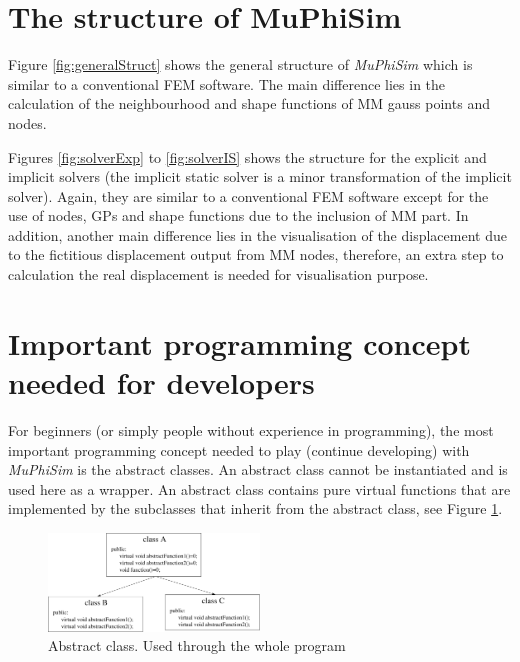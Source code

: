 \documentclass[oneside,11pt,times]{book}
\begin{document}
\section{The structure of MuPhiSim}
Figure \ref{fig:generalStruct} shows the general structure of \textit{MuPhiSim} which is similar to a conventional FEM software. The main difference lies in the calculation of the neighbourhood and shape functions of MM gauss points and nodes.


Figures \ref{fig:solverExp} to \ref{fig:solverIS} shows the structure for the explicit and implicit solvers (the implicit static solver is a minor transformation of the implicit solver). Again, they are similar to a conventional FEM software except for the use of nodes, GPs and shape functions due to the inclusion of MM part. In addition, another main difference lies in the visualisation of the displacement due to the fictitious displacement output from MM nodes, therefore, an extra step to calculation the real displacement is needed for visualisation purpose.

\section[Programming concept]{Important programming concept needed for developers}\label{sec:concept}


For beginners (or simply people without experience in programming), the most important programming concept needed to play (continue developing) with \textit{MuPhiSim} is the abstract classes. An abstract class cannot be instantiated and is used here as a wrapper. An abstract class contains pure virtual functions that are implemented by the subclasses that inherit from the abstract class, see Figure \ref{fig:abstract}.
\begin{figure}[h!]
\centering
\includegraphics[width=0.5\textwidth]{imgs/UserManual/abstract.pdf}
\caption{Abstract class. Used through the whole program}
\label{fig:abstract}
\end{figure}
\end{document}
